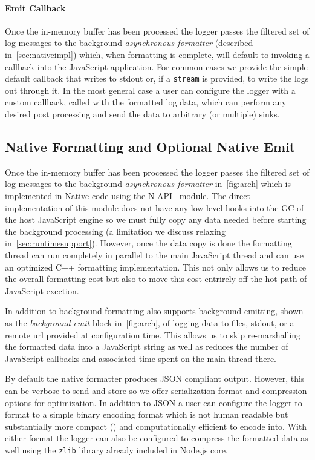 \paragraph{Emit Callback}
\noindent
Once the in-memory buffer has been processed the logger passes the filtered set of 
log messages to the background \emph{asynchronous formatter} (described in~\autoref{sec:nativeimpl}) 
which, when formatting is complete, will default to invoking a callback into the 
JavaScript application. For common cases we provide the simple default callback that 
writes to stdout or, if a \texttt{stream} is provided, to write the logs out through 
it. In the most general case a user can configure the logger with a custom callback, 
called with the formatted log data, which can perform any desired post processing and 
send the data to arbitrary (or multiple) sinks.

\subsection{Native Formatting and Optional Native Emit}
\label{sec:nativeimpl}
Once the in-memory buffer has been processed the logger passes the filtered set of 
log messages to the background \emph{asynchronous formatter} in~\autoref{fig:arch} which 
is implemented in Native code using the N-API~\cite{NAPI} module. The direct 
implementation of this module does not have any low-level hooks into the GC of 
the host JavaScript engine so we must fully copy any data needed before starting 
the background processing (a limitation we discuss relaxing in~\autoref{sec:runtimesupport}). 
However, once the data copy is done the formatting thread can run completely in parallel 
to the main JavaScript thread and can use an optimized C++ formatting implementation. This 
not only allows us to reduce the overall formatting cost but also to move this cost 
entrirely off the hot-path of JavaScript exection.

In addition to background formatting \projn also supports background emitting, 
shown as the \emph{background emit} block in~\autoref{fig:arch}, of 
logging data to files, stdout, or a remote url provided at configuration time. This 
allows us to skip re-marshalling the formatted data into a JavaScript string as well 
as reduces the number of JavaScript callbacks and associated time spent on the 
main thread there. 

By default the native formatter produces JSON compliant output. However, this 
can be verbose to send and store so we offer serialization format and compression 
options for optimization. In addition to JSON a user can configure the logger 
to format to a simple binary encoding format which is not human readable but 
substantially more compact () and computationally efficient to 
encode into. With either format the logger can also be configured to compress the 
formatted data as well using the \texttt{zlib} library already included in 
Node.js core.


